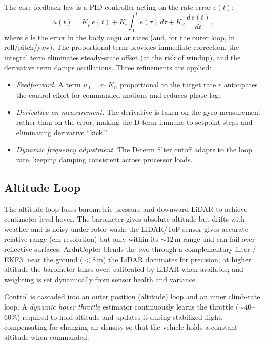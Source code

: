 \documentclass[journal]{IEEEtran}
\begin{document}
The core feedback law is a PID controller acting on the rate error
$e(t)$:
\begin{equation}
u(t) = K_p\,e(t) + K_i\!\int_0^t\! e(\tau)\,d\tau + K_d\,\frac{d\,e(t)}{dt},
\label{eq:pid}
\end{equation}
where $e$ is the error in the body angular rates (and, for the outer loop,
in roll/pitch/yaw). The proportional term provides immediate correction,
the integral term eliminates steady-state offset (at the risk of windup),
and the derivative term damps oscillations. Three refinements are applied:
\begin{itemize}
\item \emph{Feedforward.} A term $u_{\mathrm{ff}}=r\cdot K_{\mathrm{ff}}$
proportional to the target rate $r$ anticipates the control effort for
commanded motions and reduces phase lag.
\item \emph{Derivative-on-measurement.} The derivative is taken on the gyro
measurement rather than on the error, making the D-term immune to setpoint
steps and eliminating derivative ``kick.''
\item \emph{Dynamic frequency adjustment.} The D-term filter cutoff adapts
to the loop rate, keeping damping consistent across processor loads.
\end{itemize}

\subsection{Altitude Loop}
The altitude loop fuses barometric pressure and downward LiDAR to achieve
centimeter-level hover. The barometer gives absolute altitude but drifts
with weather and is noisy under rotor wash; the LiDAR/ToF sensor gives
accurate relative range (cm resolution) but only within its $\sim\!12$\,m
range and can fail over reflective surfaces. ArduCopter blends the two
through a complementary filter / EKF3: near the ground ($<8$\,m) the LiDAR
dominates for precision; at higher altitude the barometer takes over,
calibrated by LiDAR when available; and weighting is set dynamically from
sensor health and variance.

Control is cascaded into an outer position (altitude) loop and an inner
climb-rate loop. A \emph{dynamic hover throttle} estimator continuously
learns the throttle ($\sim\!40$--$60\%$) required to hold altitude and
updates it during stabilized flight, compensating for changing air density
so that the vehicle holds a constant altitude when commanded.
\end{document}
